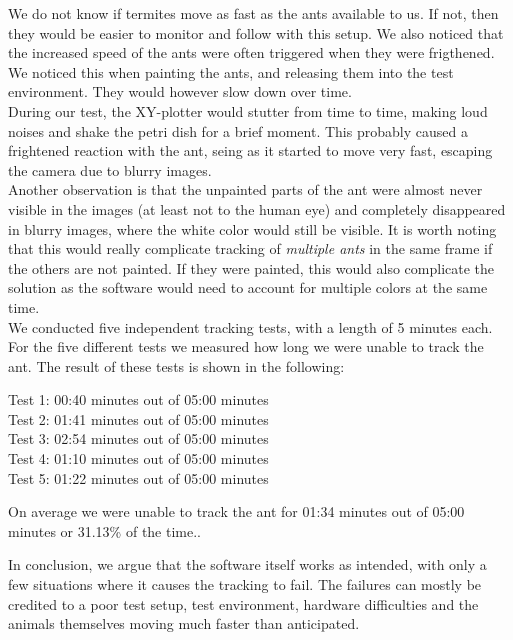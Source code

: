 We do not know if termites move as fast as the ants available to us. If not, then they would be easier to monitor and follow with this setup. We also noticed that the increased speed of the ants were often triggered when they were frigthened. We noticed this when painting the ants, and releasing them into the test environment. They would however slow down over time. \\

During our test, the XY-plotter would stutter from time to time, making loud noises and shake the petri dish for a brief moment. This probably caused a frightened reaction with the ant, seing as it started to move very fast, escaping the camera due to blurry images. \\

Another observation is that the unpainted parts of the ant were almost never visible in the images (at least not to the human eye) and completely disappeared in blurry images, where the white color would still be visible. It is worth noting that this would really complicate tracking of \emph{multiple ants} in the same frame if the others are not painted. If they were painted, this would also complicate the solution as the software would need to account for multiple colors at the same time.\\

We conducted five independent tracking tests, with a length of 5 minutes each. For the five different tests we measured how long we were unable to track the ant. The result of these tests is shown in the following:

\begin{description}
    \item[Test 1: 00:40 minutes out of 05:00 minutes]
    \item[Test 2: 01:41 minutes out of 05:00 minutes]
    \item[Test 3: 02:54 minutes out of 05:00 minutes]
    \item[Test 4: 01:10 minutes out of 05:00 minutes]
    \item[Test 5: 01:22 minutes out of 05:00 minutes]
\end{description}

On average we were unable to track the ant for 01:34 minutes out of 05:00 minutes or 31.13\% of the time..

In conclusion, we argue that the software itself works as intended, with only a few situations where it causes the tracking to fail. The failures can mostly be credited to a poor test setup, test environment, hardware difficulties and the animals themselves moving much faster than anticipated.\\